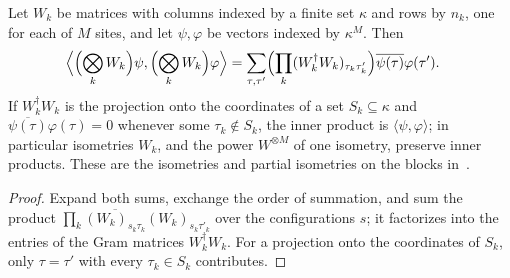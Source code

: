 \begin{lemma}
    \label{lem:elementary_tensor_power_coordinates}
    \leanok
    Let $W_k$ be matrices with columns indexed by a finite set $\kappa$ and rows
    by $n_k$, one for each of $M$ sites, and let $\psi,\varphi$ be vectors
    indexed by $\kappa^M$. Then
    \begin{align}
        \Bigl\langle\Bigl(\bigotimes_kW_k\Bigr)\psi,\Bigl(\bigotimes_kW_k\Bigr)\varphi\Bigr\rangle
         & =\sum_{\tau,\tau'}\Bigl(\prod_k(W_k^\dagger W_k)_{\tau_k\tau'_k}\Bigr)
        \overline{\psi(\tau)}\varphi(\tau').
        \notag
    \end{align}
    If $W_k^\dagger W_k$ is the projection onto the coordinates of a set
    $S_k\subseteq\kappa$ and $\overline{\psi(\tau)}\varphi(\tau)=0$ whenever
    some $\tau_k\notin S_k$, the inner product is
    $\langle\psi,\varphi\rangle$; in particular isometries $W_k$, and the power
    $W^{\otimes M}$ of one isometry, preserve inner products. These are the
    isometries and partial isometries on the blocks
    in~\cite[Supplemental Material, proof of Lemma~1]{Malz2024Preparation}.
\end{lemma}

\begin{proof}
    \leanok
    Expand both sums, exchange the order of summation, and sum the product
    $\prod_k\overline{(W_k)_{s_k\tau_k}}(W_k)_{s_k\tau'_k}$ over the
    configurations $s$; it factorizes into the entries of the Gram matrices
    $W_k^\dagger W_k$. For a projection onto the coordinates of $S_k$, only
    $\tau=\tau'$ with every $\tau_k\in S_k$ contributes.
\end{proof}
